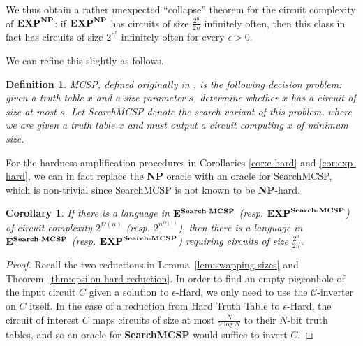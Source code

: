 \documentclass[11pt]{article}
\newtheorem{corollary}{Corollary}
\newtheorem{definition}{Definition}
\newcommand{\dash}{\text{-}}
\newcommand{\varbound}{\frac{2^n}{2n}}
\newcommand{\ttbound}{\frac{N}{2\log N}}
\def\cl{\bf}
\begin{document}
We thus obtain a rather unexpected ``collapse'' theorem for the circuit complexity of ${\cl EXP}^{\cl NP}$: if ${\cl EXP}^{\cl NP}$ has circuits of size $\varbound$ infinitely often, then this class in fact has circuits of size $2^{n^\epsilon}$ infinitely often for every $\epsilon > 0$.

We can refine this slightly as follows.
\begin{definition}
{\sc MCSP}, defined originally in \cite{circuit-minimization}, is the following decision problem: given a truth table $x$ and a size parameter $s$, determine whether $x$ has a circuit of size at most $s$. Let {\sc Search\dash MCSP} denote the search variant of this problem, where we are given a truth table $x$ and must output a circuit computing $x$ of minimum size.
\end{definition}
For the hardness amplification procedures in Corollaries \ref{cor:e-hard} and \ref{cor:exp-hard}, we can in fact replace the {\cl NP} oracle with an oracle for {\sc Search\dash MCSP}, which is non-trivial since {\sc Search\dash MCSP} is not known to be {\cl NP}-hard.
\begin{corollary}\label{cor:smcsp-amp}
If there is a language in ${\cl E}^{\cl Search\dash MCSP}$ (resp. ${\cl EXP}^{\cl Search\dash MCSP}$)  of circuit complexity $2^{\Omega(n)}$ (resp. $2^{n^{\Omega(1)}}$), then there is a language in ${\cl E}^{\cl Search\dash MCSP}$ (resp.  ${\cl EXP}^{\cl Search\dash MCSP}$)  requiring circuits of size $\varbound$.
\end{corollary}
\begin{proof}
Recall the two reductions in Lemma~\ref{lem:swapping-sizes} and Theorem~\ref{thm:epsilon-hard-reduction}. In order to find an empty pigeonhole of the input circuit $C$ given a solution to {\sc $\epsilon$-Hard}, we only need to use the $\mathcal{C}$-inverter on $C$ itself. In the case of a reduction from {\sc Hard Truth Table} to {\sc $\epsilon$-Hard}, the circuit of interest $C$ maps circuits of size at most $\ttbound$ to their $N$-bit truth tables, and so an oracle for {\cl Search\dash MCSP} would suffice to invert $C$.
\end{proof}
\end{document}
